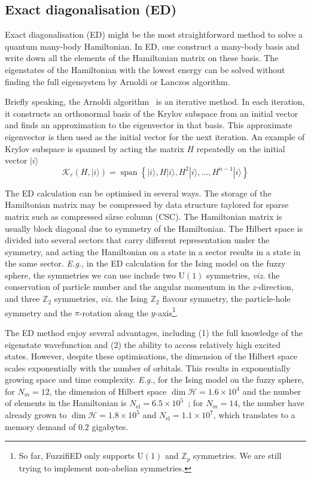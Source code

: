 \documentclass{timesjhep}
\begin{document}
\subsection{Exact diagonalisation (ED)}

Exact diagonalisation (ED) might be the most straightforward method to solve a quantum many-body Hamiltonian. In ED, one construct a many-body basis and write down all the elements of the Hamiltonian matrix on these basis. The eigenstates of the Hamiltonian with the lowest energy can be solved without finding the full eigensystem by Arnoldi or Lanczos algorithm. 

Briefly speaking, the Arnoldi algorithm~\cite{Arnoldi1951} is an iterative method. In each iteration, it constructs an orthonormal basis of the Krylov subspace from an initial vector and finds an approximation to the eigenvector in that basis. This approximate eigenvector is then used as the initial vector for the next iteration. An example of Krylov subspace is spanned by acting the matrix $H$ repeatedly on the initial vector $|i\rangle$
\begin{equation}
    \mathcal{K}_r(H,|i\rangle)=\operatorname{span}\left\{|i\rangle,H|i\rangle,H^2|i\rangle,\dots,H^{n-1}|i\rangle\right\}
\end{equation}

The ED calculation can be optimised in several ways. The storage of the Hamiltonian matrix may be compressed by data structure taylored for sparse matrix such as compressed sârse column (CSC). The Hamiltonian matrix is usually block diagonal due to symmetry of the Hamiltonian. The Hilbert space is divided into several sectors that carry different representation under the symmetry, and acting the Hamiltonian on a state in a sector results in a state in the same sector. \textit{E.g.}, in the ED calculation for the Ising model on the fuzzy sphere, the symmetries we can use include two $\mathrm{U}(1)$ symmetries, \textit{viz.} the conservation of particle number and the angular momentum in the $z$-direction, and three $\mathbb{Z}_2$ symmetries, \textit{viz.} the Ising $\mathbb{Z}_2$ flavour symmetry, the particle-hole symmetry and the $\pi$-rotation along the $y$-axis\footnote{So far, FuzzifiED only supports $\mathrm{U}(1)$ and $\mathbb{Z}_p$ symmetries. We are still trying to implement non-abelian symmetries.}.

The ED method enjoy several advantages, including (1) the full knowledge of the eigenstate wavefunction and (2) the ability to access relatively high excited states. However, despite these optimisations, the dimension of the Hilbert space scales exponentially with the number of orbitals. This results in exponentially growing space and time complexity. \textit{E.g.}, for the Ising model on the fuzzy sphere, for $N_m=12$, the dimension of Hilbert space $\dim\mathcal{H}=1.6\times10^4$ and the number of elements in the Hamiltonian is $N_
\mathrm{el}=6.5\times 10^5$~; for $N_m=14$, the number have already grown to $\dim\mathcal{H}=1.8\times10^5$ and $N_\textrm{el}=1.1\times 10^7$, which translates to a memory demand of $0.2$ gigabytes. 
\end{document}
